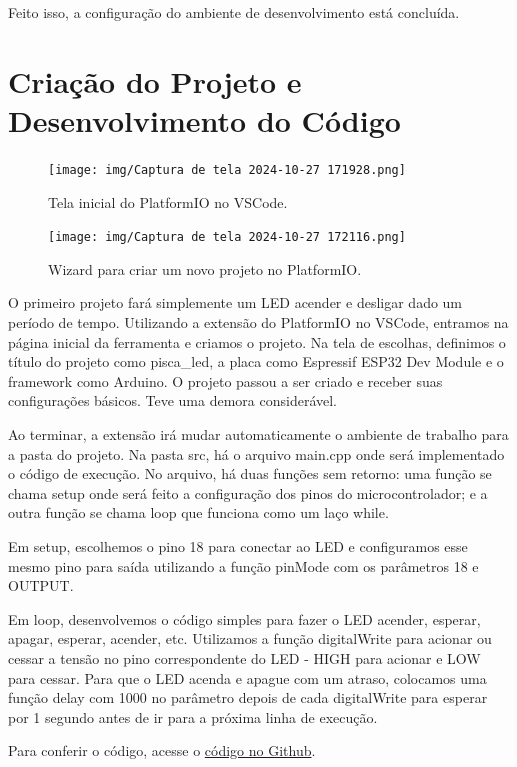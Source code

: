 \documentclass[12pt]{article}
\begin{document}
Feito isso, a configuração do ambiente de desenvolvimento está concluída.

\section{Criação do Projeto e Desenvolvimento do Código}

\begin{figure}[H]
    \centering
    \texttt{[image: img/Captura de tela 2024-10-27 171928.png]}
    \caption{Tela inicial do PlatformIO no VSCode.}
    \label{fig:platformIO-home}
\end{figure}

\begin{figure}[H]
    \centering
    \texttt{[image: img/Captura de tela 2024-10-27 172116.png]}
    \caption{Wizard para criar um novo projeto no PlatformIO.}
    \label{fig:platformIO-wizard}
\end{figure}

O primeiro projeto fará simplemente um LED acender e desligar dado um período de tempo. Utilizando a extensão do PlatformIO no VSCode, entramos na página inicial da ferramenta e criamos o projeto. Na tela de escolhas, definimos o título do projeto como pisca\_led, a placa como Espressif ESP32 Dev Module e o framework como Arduino. O projeto passou a ser criado e receber suas configurações básicos. Teve uma demora considerável.

Ao terminar, a extensão irá mudar automaticamente o ambiente de trabalho para a pasta do projeto. Na pasta src, há o arquivo main.cpp onde será implementado o código de execução. No arquivo, há duas funções sem retorno: uma função se chama setup onde será feito a configuração dos pinos do microcontrolador; e a outra função se chama loop que funciona como um laço while.

Em setup, escolhemos o pino 18 para conectar ao LED e configuramos esse mesmo pino para saída utilizando a função pinMode com os parâmetros 18 e OUTPUT.

Em loop, desenvolvemos o código simples para fazer o LED acender, esperar, apagar, esperar, acender, etc. Utilizamos a função digitalWrite para acionar ou cessar a tensão no pino correspondente do LED - HIGH para acionar e LOW para cessar. Para que o LED acenda e apague com um atraso, colocamos uma função delay com 1000 no parâmetro depois de cada digitalWrite para esperar por 1 segundo antes de ir para a próxima linha de execução.

Para conferir o código, acesse o \href{https://github.com/fabricio-araujo94/microcontroladores/blob/main/pisca_led/}{código no Github}.
\end{document}
